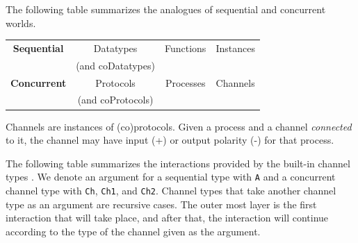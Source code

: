 \documentclass[11pt]{article}
\begin{document}
The following table summarizes the analogues of sequential and concurrent worlds.

\begin{center}
\begin{tabular}{ c | c | c | c }
 {\bf Sequential} & Datatypes  & Functions & Instances \\ 
   & (and coDatatypes)  &  &  \\
 \hline
 {\bf Concurrent} & Protocols & Processes & Channels \\  
 & (and coProtocols)  &  &  \\
\end{tabular}
\end{center}

Channels are instances of (co)protocols. Given a process and a channel {\em connected} to it, the channel may have input (+) or output polarity (-) for that process. 

The following table summarizes the interactions provided by the built-in channel types \cite[Section 3.3.2]{Ku18}.
We denote an argument for a sequential type with \lstinline$A$ and a concurrent channel type with \lstinline$Ch$, \lstinline$Ch1$, and \lstinline$Ch2$.
Channel types that take another channel type as an argument are recursive cases.
The outer most layer is the first interaction that will take place, and after that, the interaction will continue according to the type of the channel given as the argument.
\end{document}
